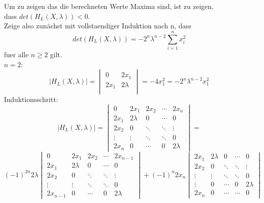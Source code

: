 \documentclass[11pt]{scrartcl}
\begin{document}
			Um zu zeigen das die berechneten Werte Maxima sind, ist zu zeigen,\\ dass \(det(H_{L}(X,\lambda))<0\).\\
			Zeige also zunächst mit vollstaendiger Induktion nach n, dass
			\begin{equation}
			det(H_{L}(X,\lambda))=-2^n\lambda^{n-2}\sum_{i=1}^{n}x_{i}^2
			\end{equation}
			fuer alle \(n\geq2\) gilt.\\
			\(n=2\):
			\begin{equation}
			|H_{L}(X,\lambda)|=
			\begin{vmatrix}
				0 & 2x_{1} \\
				2x_{1} & 2\lambda\\
			\end{vmatrix}
			=-4x_{1}^2=-2^n\lambda^{n-2}x_{1}^2
			\end{equation}
			Induktionsschritt:
			\begin{equation}
			|H_{L}(X,\lambda)|=
			\begin{vmatrix}
				0 & 2x_{1} & 2x_{2} & \cdots & 2x_{n} \\
				2x_{1} & 2\lambda & 0 & \cdots & 0 \\
				2x_{2} & 0 & \ddots & \ddots & \vdots \\
				\vdots & \vdots & \ddots & \ddots & 0 \\
				2x_{n} &  0 & \cdots & 0 & 2\lambda
			\end{vmatrix}
			=
			\end{equation}
			\begin{equation}
			(-1)^{2n}2\lambda
			\begin{vmatrix}
			0 & 2x_{1} & 2x_{2} & \cdots & 2x_{n-1} \\
			2x_{1} & 2\lambda & 0 & \cdots & 0 \\
			2x_{2} & 0 & \ddots & \ddots & \vdots \\
			\vdots & \vdots & \ddots & \ddots & 0 \\
			2x_{n-1} &  0 & \cdots & 0 & 2\lambda
			\end{vmatrix}
			+(-1)^{n}2x_{n}
			\begin{vmatrix}
			2x_{1} & 2\lambda & 0 & \cdots & 0 \\
			2x_{2} & 0 & \ddots & \ddots & \vdots \\
			\vdots & \vdots & \ddots & \ddots & 0 \\
			\vdots & 0 & \cdots & 0 & 2\lambda \\
			2x_{n} &  0 & \cdots & \cdots & 0
			\end{vmatrix}
			\end{equation}
\end{document}
